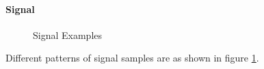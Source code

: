 \documentclass[11pt,a4paper]{article}
\begin{document}
\paragraph{Signal}
\begin{figure}
    \centering
    \ffigbox[\FBwidth]{}
    {
        {
            \begin{subfloatrow}[2]
            \end{subfloatrow}
        }
        \caption{Signal Examples}\label{fig:signal}
    }
\end{figure}
Different patterns of signal samples are as shown in figure \ref{fig:signal}.
\end{document}

